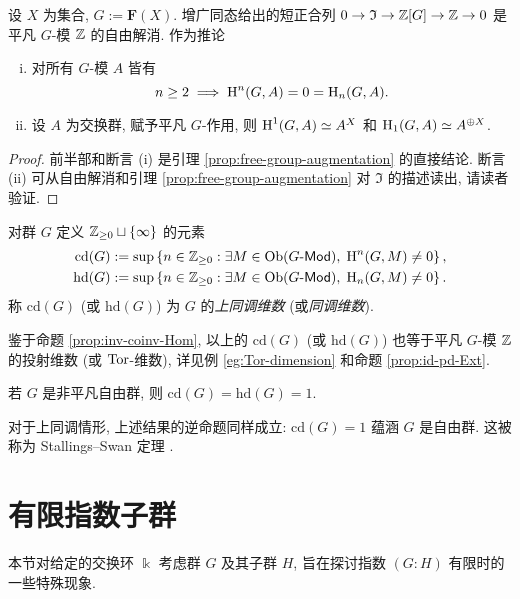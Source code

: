 \begin{proposition}\label{prop:free-group-coh}
	设 $X$ 为集合, $G := \mathbf{F}(X)$. 增广同态给出的短正合列 $0 \to \mathfrak{I} \to \mathbb{Z}[G] \to \mathbb{Z} \to 0$ 是平凡 $G$-模 $\mathbb{Z}$ 的自由解消. 作为推论
	\begin{enumerate}[(i)]
		\item 对所有 $G$-模 $A$ 皆有
		\[ n \geq 2 \implies \operatorname{H}^n(G, A) = 0 = \operatorname{H}_n(G, A). \]
		\item 设 $A$ 为交换群, 赋予平凡 $G$-作用, 则 $\operatorname{H}^1(G, A) \simeq A^X$ 和 $\operatorname{H}_1(G, A) \simeq A^{\oplus X}$.
	\end{enumerate}
\end{proposition}
\begin{proof}
	前半部和断言 (i) 是引理 \ref{prop:free-group-augmentation} 的直接结论. 断言 (ii) 可从自由解消和引理 \ref{prop:free-group-augmentation} 对 $\mathfrak{I}$ 的描述读出, 请读者验证.
\end{proof}

\begin{definition}\label{def:group-dim}
	对群 $G$ 定义 $\mathbb{Z}_{\geq 0} \sqcup \{\infty\}$ 的元素
	\begin{align*}
		\mathrm{cd}(G) & := \sup\left\{ n \in \mathbb{Z}_{\geq 0}: \exists M \in \operatorname{Ob}(G\text{-}\mathsf{Mod}), \; \operatorname{H}^n(G, M) \neq 0 \right\}, \\
		\mathrm{hd}(G) & := \sup\left\{ n \in \mathbb{Z}_{\geq 0}: \exists M \in \operatorname{Ob}(G\text{-}\mathsf{Mod}), \; \operatorname{H}_n(G, M) \neq 0 \right\}.
	\end{align*}
	称 $\mathrm{cd}(G)$ (或 $\mathrm{hd}(G)$) 为 $G$ 的\emph{上同调维数} (或\emph{同调维数}).
\end{definition}

鉴于命题 \ref{prop:inv-coinv-Hom}, 以上的 $\mathrm{cd}(G)$ (或 $\mathrm{hd}(G)$) 也等于平凡 $G$-模 $\mathbb{Z}$ 的投射维数 (或 $\operatorname{Tor}$-维数), 详见例 \ref{eg:Tor-dimension} 和命题 \ref{prop:id-pd-Ext}.

\begin{corollary}
	若 $G$ 是非平凡自由群, 则 $\mathrm{cd}(G) = \mathrm{hd}(G) = 1$.
\end{corollary}

对于上同调情形, 上述结果的逆命题同样成立: $\mathrm{cd}(G) = 1$ 蕴涵 $G$ 是自由群. 这被称为 Stallings--Swan 定理 \cite{Sw69}.

\section{有限指数子群}\label{sec:group-finite-index}
本节对给定的交换环 $\Bbbk$ 考虑群 $G$ 及其子群 $H$, 旨在探讨指数 $(G:H)$ 有限时的一些特殊现象.

